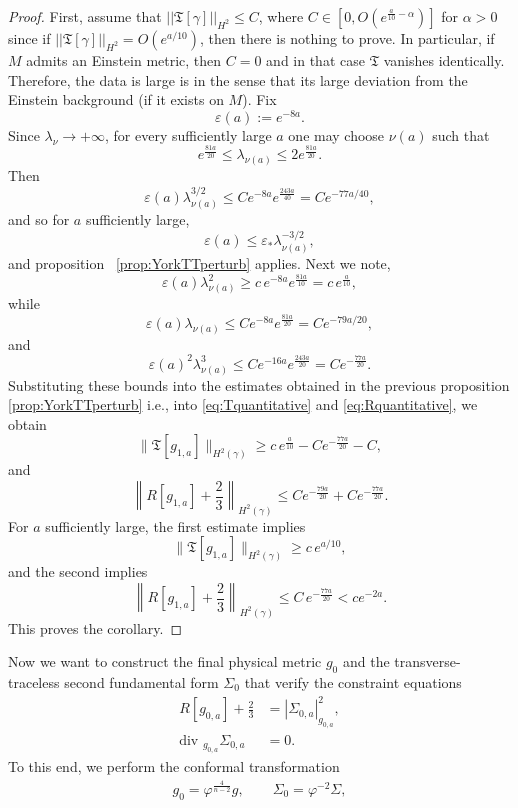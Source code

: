 \documentclass{amsart}
\renewcommand{\div}{\mbox{div }}
\begin{document}
\begin{proof}
First, assume that $||\mathfrak{T}[\gamma]||_{H^{2}}\leq C$, where $C\in [0,O(e^{\frac{a}{10}-\alpha})]$ for $\alpha>0$ since if $||\mathfrak{T}[\gamma]||_{H^{2}}=O(e^{a/10})$, then there is nothing to prove. In particular, if $M$ admits an Einstein metric, then $C=0$ and in that case $\mathfrak{T}$ vanishes identically. Therefore, the data is large is in the sense that its large deviation from the Einstein background (if it exists on $M$). 
Fix
\[
\varepsilon(a):=e^{-8a}.
\]
Since \(\lambda_{\nu}\to +\infty\), for every sufficiently large \(a\) one may choose \(\nu(a)\) such that
\[
e^{\frac{81a}{20}}\leq \lambda_{\nu(a)}\leq 2e^{\frac{81a}{20}}.
\]
Then
\[
\varepsilon(a)\lambda_{\nu(a)}^{3/2}
\leq
Ce^{-8a}e^{\frac{243a}{40}}
=
Ce^{-77a/40},
\]
and so for \(a\) sufficiently large,
\[
\varepsilon(a)\leq \varepsilon_{\ast}\lambda_{\nu(a)}^{-3/2},
\]
and proposition ~\ref{prop:YorkTTperturb} applies.
\noindent Next we note, 
\[
\varepsilon(a)\lambda_{\nu(a)}^{2}
\geq
c\,e^{-8a}e^{\frac{81a}{10}}
=
c\,e^{\frac{a}{10}},
\]
while
\[
\varepsilon(a)\lambda_{\nu(a)}
\leq
Ce^{-8a}e^{\frac{81a}{20}}
=
Ce^{-79a/20},
\]
and
\[
\varepsilon(a)^{2}\lambda_{\nu(a)}^{3}
\leq
Ce^{-16a}e^{\frac{243a}{20}}
=
Ce^{-\frac{77a}{20}}.
\]
Substituting these bounds into the estimates obtained in the previous proposition \ref{prop:YorkTTperturb} i.e., into \eqref{eq:Tquantitative} and \eqref{eq:Rquantitative}, we obtain
\[
\|\mathfrak T[g_{1,a}]\|_{H^{2}(\gamma)}
\geq
c\,e^{\frac{a}{10}}
-
Ce^{-\frac{77a}{20}}
-
C,
\]
and
\[
\left\|R[g_{1,a}]+\frac23\right\|_{H^{2}(\gamma)}
\leq
Ce^{-\frac{79a}{20}}
+
Ce^{-\frac{77a}{20}}.
\]
For \(a\) sufficiently large, the first estimate implies
\[
\|\mathfrak T[g_{1,a}]\|_{H^{2}(\gamma)}\geq c\,e^{a/10},
\]
and the second implies
\[
\left\|R[g_{1,a}]+\frac23\right\|_{H^{2}(\gamma)}\leq C\,e^{-\frac{77a}{20}}<ce^{-2a}.
\]
This proves the corollary.
\end{proof}
\noindent Now we want to construct the final physical metric $g_{0}$ and the transverse-traceless second fundamental form $\Sigma_{0}$ that verify the constraint equations 
\begin{align}
R[g_{0,a}]+\frac23&=|\Sigma_{0,a}|_{g_{0,a}}^{2},\\
\div_{g_{0,a}}\Sigma_{0,a}&=0.
\end{align}
To this end, we perform the conformal transformation 
\begin{align}
 g_{0}=\varphi^{\frac{4}{n-2}}g,
\qquad
\Sigma_{0}=\varphi^{-2}\Sigma,   
\end{align}
\end{document}
